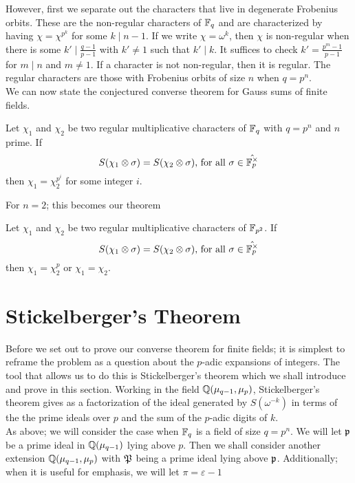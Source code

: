However, first we separate out the characters that live in degenerate Frobenius orbits. 
These are the non-regular characters of $\mathbb{F}_q$ and are characterized by having $\chi = \chi^{p^k}$ for some $k \mid n-1$. 
If we write $\chi = \omega^k$, then $\chi$ is non-regular when there is some $k' \mid \frac{q-1}{p-1}$ with $k' \neq 1$ such that $k' \mid k$.
It suffices to check $k' = \frac{p^m - 1}{p-1}$ for $m \mid n$ and $m \neq 1$.
If a character is not non-regular, then it is regular. 
The regular characters are those with Frobenius orbits of size $n$ when $q = p^n$.\\

We can now state the conjectured converse theorem for Gauss sums of finite fields.
\begin{conj}[Nien]\label{conj:local-converse-FF}
Let $\chi_1$ and $\chi_2$ be two regular multiplicative characters of $\mathbb{F}_q$ with $q = p^n$ and $n$ prime. If \[S(\chi_1 \otimes \sigma) = S(\chi_2 \otimes \sigma)\text{, for all } \sigma \in \hat{\mathbb{F}_p^\times}\] then $\chi_1 = \chi_2^{p^i}$ for some integer $i$.
\end{conj}

For $n=2$; this becomes our theorem 
\begin{theorem}\label{thm:local-converse-FF}
Let $\chi_1$ and $\chi_2$ be two regular multiplicative characters of $\mathbb{F}_{p^2}$. If \[S(\chi_1 \otimes \sigma) = S(\chi_2 \otimes \sigma)\text{, for all } \sigma \in \hat{\mathbb{F}_p^\times}\] then $\chi_1 = \chi_2^{p}$ or $\chi_1 = \chi_2$.
\end{theorem}


\section{Stickelberger's Theorem}
\label{sec:stickelberger}
Before we set out to prove our converse theorem for finite fields; it is simplest to reframe the problem as a question about the $p$-adic expansions of integers.
The tool that allows us to do this is Stickelberger's theorem which we shall introduce and prove in this section.
Working in the field $\mathbb{Q}(\mu_{q-1}, \mu_p)$, Stickelberger's theorem gives as a factorization of the ideal generated by $S(\omega^{-k})$ in terms of the the prime ideals over $p$ and the sum of the $p$-adic digits of $k$.
\\

As above; we will consider the case when $\mathbb{F}_q$ is a field of size $q = p^n$. 
We will let $\mathfrak{p}$ be a prime ideal in $\mathbb{Q}(\mu_{q-1})$ lying above $p$. 
Then we shall consider another extension $\mathbb{Q}(\mu_{q-1}, \mu_p)$ with $\mathfrak{P}$ being a prime ideal lying above $\mathfrak{p}$. Additionally; when it is useful for emphasis, we will let $\pi = \varepsilon - 1$
\\

